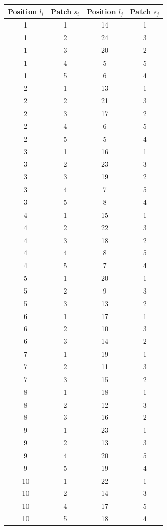 \documentclass[a4paper, amsfonts, amssymb, amsmath, reprint, showkeys, nofootinbib, twoside]{revtex4-1}
\begin{document}
\begin{table}[h!]
	\begin{tabular}{ cccc } 
		\hline
		Position $l_i$ & Patch $s_i$ & Position $l_j$ & Patch $s_j$ \\
		\hline
		1 & 1 & 14 & 1 \\
		1 & 2 & 24 & 3 \\
		1 & 3 & 20 & 2 \\
		1 & 4 & 5 & 5 \\
		1 & 5 & 6 & 4 \\
		2 & 1 & 13 & 1 \\
		2 & 2 & 21 & 3 \\
		2 & 3 & 17 & 2 \\
		2 & 4 & 6 & 5 \\
		2 & 5 & 5 & 4 \\
		3 & 1 & 16 & 1 \\
		3 & 2 & 23 & 3 \\
		3 & 3 & 19 & 2 \\
		3 & 4 & 7 & 5 \\
		3 & 5 & 8 & 4 \\
		4 & 1 & 15 & 1 \\
		4 & 2 & 22 & 3 \\
		4 & 3 & 18 & 2 \\
		4 & 4 & 8 & 5 \\
		4 & 5 & 7 & 4 \\
		5 & 1 & 20 & 1 \\
		5 & 2 & 9 & 3 \\
		5 & 3 & 13 & 2 \\
		6 & 1 & 17 & 1 \\
		6 & 2 & 10 & 3 \\
		6 & 3 & 14 & 2 \\
		7 & 1 & 19 & 1 \\
		7 & 2 & 11 & 3 \\
		7 & 3 & 15 & 2 \\
		8 & 1 & 18 & 1 \\
		8 & 2 & 12 & 3 \\
		8 & 3 & 16 & 2 \\
		9 & 1 & 23 & 1 \\
		9 & 2 & 13 & 3 \\
		9 & 4 & 20 & 5 \\
		9 & 5 & 19 & 4 \\
		10 & 1 & 22 & 1 \\
		10 & 2 & 14 & 3 \\
		10 & 4 & 17 & 5 \\
		10 & 5 & 18 & 4 \\

\end{tabular}
\end{table}
\end{document}
